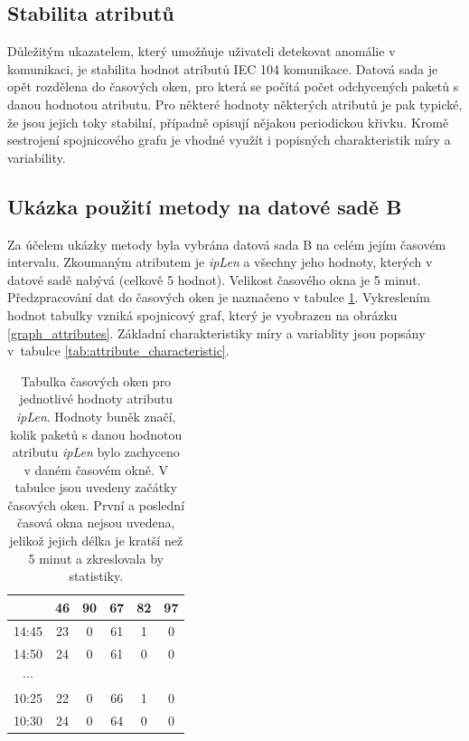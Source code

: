 \subsection{Stabilita atributů}
\label{attribute_stability}

Důležitým ukazatelem, který umožňuje uživateli detekovat anomálie v komunikaci, je stabilita hodnot atributů IEC 104 komunikace. Datová sada je opět rozdělena do časových oken, pro která se počítá počet odchycených paketů s danou hodnotou atributu. Pro některé hodnoty některých atributů je pak typické, že jsou jejich toky stabilní, případně opisují nějakou periodickou křivku. Kromě sestrojení spojnicového grafu je vhodné využít i popisných charakteristik míry a variability.

\subsection*{Ukázka použití metody na datové sadě B}

Za účelem ukázky metody byla vybrána datová sada B na celém jejím časovém intervalu. Zkoumaným atributem je \emph{ipLen} a všechny jeho hodnoty, kterých v datové sadě nabývá (celkově 5 hodnot). Velikost časového okna je 5 minut. Předzpracování dat do časových oken je naznačeno v tabulce \ref{tab:windows}. Vykreslením hodnot tabulky vzniká spojnicový graf, který je vyobrazen na obrázku \ref{graph_attributes}. Základní charakteristiky míry a variablity jsou popsány v~tabulce \ref{tab:attribute_characteristic}.

\begin{table}[H]
\centering
\begin{tabular}{|c|c|c|c|c|c|}
\hline
         & 46 & 90 & 67 & 82 & 97 \\ \hline
14:45    & 23 & 0  & 61 & 1  & 0  \\ \hline
14:50    & 24 & 0  & 61 & 0  & 0  \\ \hline
$\cdots$ &    &    &    &    &    \\ \hline
10:25    & 22 & 0  & 66 & 1  & 0  \\ \hline
10:30    & 24 & 0  & 64 & 0  & 0  \\ \hline
\end{tabular}
\caption{Tabulka časových oken pro jednotlivé hodnoty atributu \emph{ipLen}. Hodnoty buněk značí, kolik paketů s danou hodnotou atributu \emph{ipLen} bylo zachyceno v daném časovém okně. V tabulce jsou uvedeny začátky časových oken. První a poslední časová okna nejsou uvedena, jelikož jejich délka je kratší než 5 minut a zkreslovala by statistiky.}
\label{tab:windows}
\end{table}


